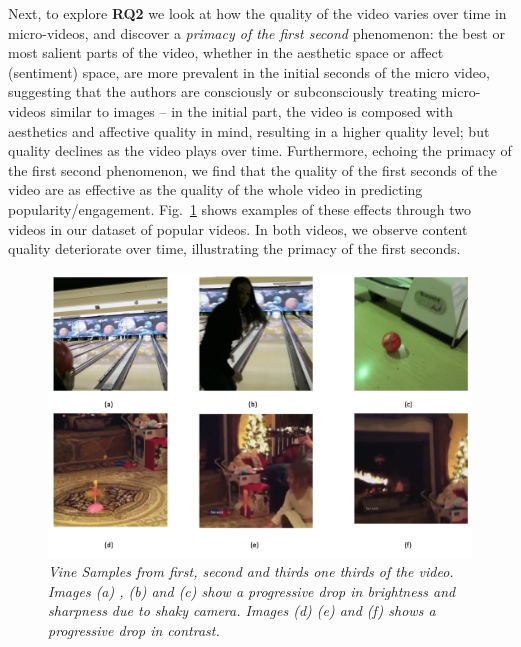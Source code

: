Next, to explore \textbf{RQ2} we look at how the quality of the video varies over time in micro-videos, and discover a \emph{primacy of the first second} phenomenon: the best or most salient parts of the video, whether in the aesthetic space or affect (sentiment) space, are more prevalent in the initial seconds of the micro video, suggesting that the authors are consciously or subconsciously treating micro-videos similar to images -- in the initial part, the video is composed with aesthetics and affective quality in mind, resulting in a higher quality level; but quality declines as the video plays over time. Furthermore, echoing the primacy of the first second phenomenon, we find that the quality of the first seconds of the video are as effective as the quality of the whole video in predicting popularity/engagement. Fig.~\ref{fig:Vine_samples} shows examples of these effects through two videos in our dataset of popular videos. In both videos, we observe content quality deteriorate over time, illustrating the primacy of the first seconds. 
 
\begin{figure}[!tbh]
\centering
\includegraphics[width=0.7\columnwidth]{figures/Vine_samples2}
\caption{\textsl{ Vine Samples from first, second and thirds one thirds of the video. Images (a) , (b) and (c) show a progressive drop in brightness and sharpness due to shaky camera. Images (d) (e) and (f) shows a progressive drop in contrast.}}
\label{fig:Vine_samples}
\end{figure}

